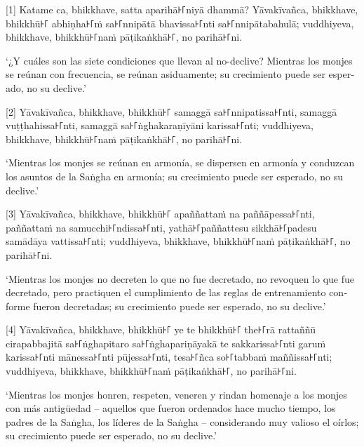 [1] Katame ca, bhikkhave, satta aparihā꜔꜒niyā dhammā? Yāvakīvañca, bhikkhave, bhikkhū꜔꜒
abhiṇha꜔꜒ṁ sa꜔꜒nnipātā bhavissa꜔꜒nti sa꜔꜒nnipātabahulā; vuddhiyeva, bhikkhave,
bhikkhū꜔꜒naṁ pāṭikaṅkhā꜔꜒, no parihā꜔꜒ni.

\begin{english}
  ‘¿Y cuáles son las siete condiciones que llevan al no-declive? Mientras los monjes
  se reúnan con frecuencia, se reúnan asiduamente; su crecimiento puede ser esperado, no su declive.’

\end{english}

[2] Yāvakīvañca, bhikkhave, bhikkhū꜔꜒ samaggā sa꜔꜒nnipatissa꜔꜒nti, samaggā
vuṭṭhahissa꜔꜒nti, samaggā sa꜔꜒ṅghakaraṇīyāni karissa꜔꜒nti; vuddhiyeva, bhikkhave,
bhikkhū꜔꜒naṁ pāṭikaṅkhā꜔꜒, no parihā꜔꜒ni.

\begin{english}
  ‘Mientras los monjes se reúnan en armonía, se dispersen en armonía y conduzcan los asuntos de la Saṅgha en armonía; su crecimiento puede ser
  esperado, no su declive.’
\end{english}

[3] Yāvakīvañca, bhikkhave, bhikkhū꜔꜒ apaññattaṁ na paññāpessa꜔꜒nti, paññattaṁ na
samucchi꜔꜒ndissa꜔꜒nti, yathā꜔꜒paññattesu sikkhā꜔꜒padesu samādāya vattissa꜔꜒nti;
vuddhiyeva, bhikkhave, bhikkhū꜔꜒naṁ pāṭikaṅkhā꜔꜒, no parihā꜔꜒ni.

\begin{english}
  ‘Mientras los monjes no decreten lo que no fue decretado, no revoquen lo que
  fue decretado, pero practiquen el cumplimiento de las reglas de entrenamiento conforme
  fueron decretadas; su crecimiento puede ser
  esperado, no su declive.’
\end{english}

[4] Yāvakīvañca, bhikkhave, bhikkhū꜔꜒ ye te bhikkhū꜔꜒ the꜔꜒rā rattaññū cirapabbajitā
sa꜔꜒ṅghapitaro sa꜔꜒ṅghapariṇāyakā te sakkarissa꜔꜒nti garuṁ karissa꜔꜒nti mānessa꜔꜒nti
pūjessa꜔꜒nti, tesa꜔꜒ñca so꜔꜒tabbaṁ maññissa꜔꜒nti; vuddhiyeva, bhikkhave, bhikkhū꜔꜒naṁ
pāṭikaṅkhā꜔꜒, no parihā꜔꜒ni.

\begin{english}
  ‘Mientras los monjes honren, respeten, veneren y rindan homenaje a los
  monjes con más antigüedad  -- aquellos que fueron ordenados hace mucho tiempo, los padres de la Saṅgha, los líderes de la Saṅgha -- considerando muy valioso el oírlos; su crecimiento puede ser
  esperado, no su declive.’
\end{english}

